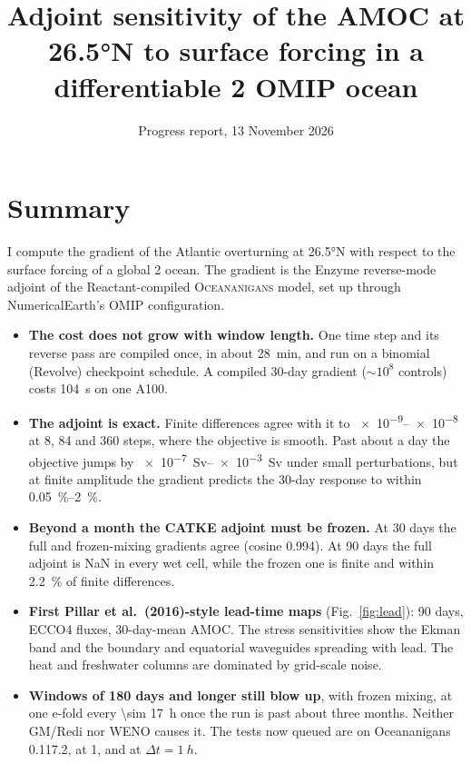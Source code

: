 \documentclass[10pt]{article}
\title{\vspace{-2.2em}\textbf{Adjoint sensitivity of the AMOC at \ang{26.5}N to surface forcing in a
       differentiable 2\textdegree{} OMIP ocean}\vspace{-0.6em}}
\date{Progress report, 13 November 2026\vspace{-1.2em}}
\begin{document}
\maketitle

\section*{Summary}

I compute the gradient of the Atlantic overturning at \ang{26.5}N with respect to the surface forcing
of a global 2\textdegree{} ocean. The gradient is the Enzyme reverse-mode adjoint of the
Reactant-compiled \textsc{Oceananigans} model, set up through NumericalEarth's OMIP configuration.
\begin{itemize}
  \item \textbf{The cost does not grow with window length.} One time step and its reverse pass are compiled
        once, in about \SI{28}{min}, and run on a binomial (Revolve) checkpoint schedule. A compiled 30-day
        gradient ($\sim\!10^8$ controls) costs \SI{104}{s} on one A100.
  \item \textbf{The adjoint is exact.} Finite differences agree with it to \numrange{e-9}{e-8} at 8, 84 and
        360 steps, where the objective is smooth. Past about a day the objective jumps by
        \SIrange{e-7}{e-3}{Sv} under small perturbations, but at finite amplitude the gradient predicts the
        30-day response to within \SIrange{0.05}{2}{\percent}.
  \item \textbf{Beyond a month the CATKE adjoint must be frozen.} At 30 days the full and frozen-mixing
        gradients agree (cosine 0.994). At 90 days the full adjoint is NaN in every wet cell, while the frozen
        one is finite and within \SI{2.2}{\percent} of finite differences.
  \item \textbf{First Pillar et al.\ (2016)-style lead-time maps} (Fig.~\ref{fig:lead}): 90 days, ECCO4 fluxes,
        30-day-mean AMOC. The stress sensitivities show the Ekman band and the boundary and equatorial
        waveguides spreading with lead. The heat and freshwater columns are dominated by grid-scale noise.
  \item \textbf{Windows of 180 days and longer still blow up}, with frozen mixing, at one e-fold every
        \SI{\sim 17}{h} once the run is past about three months. Neither GM/Redi nor WENO causes it. The tests
        now queued are on Oceananigans 0.117.2, at 1\textdegree, and at $\Delta t = \SI{1}{h}$.
\end{itemize}
\end{document}
